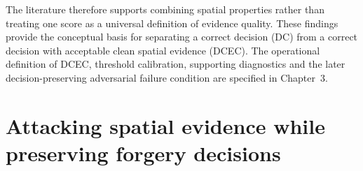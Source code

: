 The literature therefore supports combining spatial properties rather than treating one score as a universal definition of evidence quality. These findings provide the conceptual basis for separating a correct decision (DC) from a correct decision with acceptable clean spatial evidence (DCEC). The operational definition of DCEC, threshold calibration, supporting diagnostics and the later decision-preserving adversarial failure condition are specified in Chapter~3.







\section{Attacking spatial evidence while preserving forgery decisions}
\label{sec:lr-xai-attacks}


